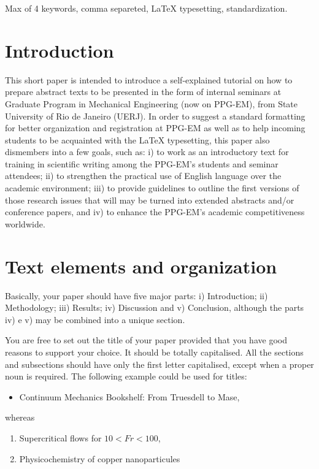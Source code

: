 \documentclass[date,twocolumn,a4paper]{ppgem}
\begin{document}
\thispagestyle{plain}
\makeheader



\begin{keywords}
Max of 4 keywords, comma separeted, {\LaTeX} typesetting, standardization.
\end{keywords}

\section{Introduction}

This short paper is intended to introduce a self-explained tutorial on
how to prepare abstract texts to be presented in the form of internal
seminars at Graduate Program in Mechanical Engineering (now on PPG-EM),
from State University of Rio de Janeiro (UERJ). In order to suggest a
standard formatting for better organization and registration at PPG-EM
as well as to help incoming students to be acquainted with the {\LaTeX}
typesetting, this paper also dismembers into a few goals, such as: i) to
work as an introductory text for training in scientific writing among
the PPG-EM's students and seminar attendees; ii) to strengthen the
practical use of English language over the academic environment; iii) to
provide guidelines to outline the first versions of those research
issues that will may be turned into extended abstracts and/or conference
papers, and iv) to enhance the PPG-EM's academic competitiveness
worldwide. 

\section{Text elements and organization}

Basically, your paper should have five major parts: i) Introduction; ii)
Methodology; iii) Results; iv) Discussion and v) Conclusion, although
the parts iv) e v) may be combined into a unique section. 

You are free to set out the title of your paper provided that you have
good reasons to support your choice. It should be totally capitalised.
All the sections and subsections should have only the first letter
capitalised, except when a proper noun is required. The following
example could be used for titles:

\begin{itemize}
\item Continuum Mechanics Bookshelf: From Truesdell to Mase, 
\end{itemize}
whereas
\begin{enumerate}
\item  Supercritical flows for $ 10 < Fr < 100 $, 
\item  Physicochemistry of copper nanoparticules  
\end{enumerate}
\end{document}
